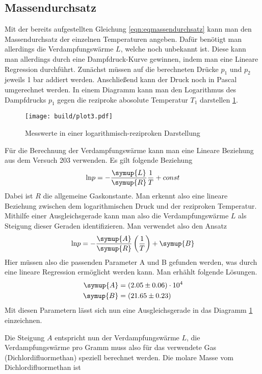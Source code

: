\subsection{Massendurchsatz}
Mit der bereits aufgestellten Gleichung \eqref{eqn:eqmassendurchsatz} kann man den Massendurchsatz der einzelnen Temperaturen angeben.
Dafür benötigt man allerdings die Verdampfungswärme $L$, welche noch unbekannt ist. Diese kann man allerdings durch eine Dampfdruck-Kurve gewinnen, indem man eine Lineare Regression durchführt.
Zunächst müssen auf die berechneten Drücke $p_{1}$ und $p_{2}$ jeweils 1 bar addiert werden. Anschließend kann der Druck noch in Pascal umgerechnet werden. In einem Diagramm kann man den Logarithmus des Dampfdrucks $p_{1}$ gegen die reziproke abosolute Temperatur $T_{1}$ darstellen \ref{fig:plot3}.
\begin{figure}[h]
  \centering
  \texttt{[image: build/plot3.pdf]}
  \caption{Messwerte in einer logarithmisch-reziproken Darstellung}
  \label{fig:plot3}
\end{figure}
Für die Berechnung der Verdampfungswärme kann man eine Lineare Beziehung aus dem Versuch 203 verwenden. Es gilt folgende Beziehung
\begin{equation}
\text{ln} p = - \frac{\symup{L}}{\symup{R}} \frac{1}{T} + const
\end{equation}
Dabei ist $R$ die allgemeine Gaskonstante. Man erkennt also eine lineare Beziehung zwischen dem logarithmischen Druck und der reziproken Temperatur.
Mithilfe einer Ausgleichsgerade kann man also die Verdampfungswärme $L$ als Steigung dieser Geraden identifizieren.
Man verwendet also den Ansatz
\begin{equation}
\text{ln} p = - \frac{\symup{A}}{\symup{R}} \left( \frac{1}{T} \right) + \symup{B} 
\end{equation}
Hier müssen also die passenden Parameter A und B gefunden werden, was durch eine lineare Regression ermöglicht werden kann.
Man erhählt folgende Lösungen.
\begin{align}
\symup{A} &= (2.05\pm0.06)\cdot 10^{4} \\
\symup{B} &= (21.65\pm0.23)
\end{align}
Mit diesen Parametern lässt sich nun eine Ausgleichsgerade in das Diagramm \ref{fig:plot3} einzeichnen.
\newpage
\begin{flushleft}
Die Steigung $A$ entspricht nun der Verdampfungswärme $L$, die Verdampfungswärme pro Gramm muss also für das verwendete Gas (Dichlordifluormethan) speziell berechnet werden.
Die molare Masse vom Dichlordifluormethan ist
\end{flushleft}
